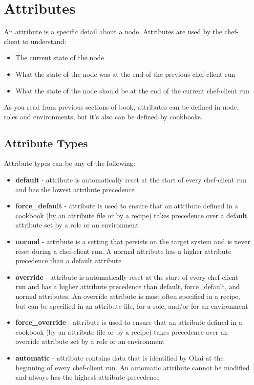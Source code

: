 \section{Attributes}\label{sec:server-attributes}

An attribute is a specific detail about a node. Attributes are used by the chef-client to understand:

\begin{itemize}
  \item The current state of the node
  \item What the state of the node was at the end of the previous chef-client run
  \item What the state of the node should be at the end of the current chef-client run
\end{itemize}

As you read from previous sections of book, attributes can be defined in node, roles and environments, but it's also can be defined by cookbooks.

\subsection{Attribute Types}

Attribute types can be any of the following:

\begin{itemize}
  \item \textbf{default} - attribute is automatically reset at the start of every chef-client run and has the lowest attribute precedence
  \item \textbf{force\_default} - attribute is used to ensure that an attribute defined in a cookbook (by an attribute file or by a recipe) takes precedence over a default attribute set by a role or an environment
  \item \textbf{normal} - attribute is a setting that persists on the target system and is never reset during a chef-client run. A normal attribute has a higher attribute precedence than a default attribute
  \item \textbf{override} - attribute is automatically reset at the start of every chef-client run and has a higher attribute precedence than default, force\_default, and normal attributes. An override attribute is most often specified in a recipe, but can be specified in an attribute file, for a role, and/or for an environment
  \item \textbf{force\_override} - attribute is used to ensure that an attribute defined in a cookbook (by an attribute file or by a recipe) takes precedence over an override attribute set by a role or an environment
  \item \textbf{automatic} - attribute contains data that is identified by Ohai at the beginning of every chef-client run. An automatic attribute cannot be modified and always has the highest attribute precedence
\end{itemize}

